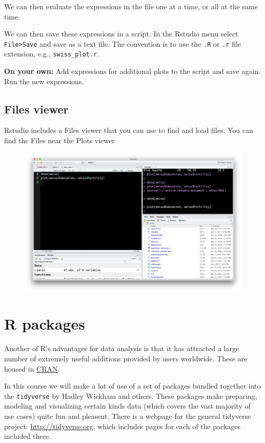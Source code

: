 \documentclass[12pt,]{book}
\theoremstyle{definition}
\theoremstyle{definition}
\theoremstyle{definition}
\theoremstyle{remark}
\begin{document}
We can then evaluate the expressions in the file one at a time, or all
at the same time.

We can then save these expressions in a script. In the Rstudio menu
select \texttt{File\textgreater{}Save} and save as a text file. The
convention is to use the \texttt{.R} or \texttt{.r} file extension,
e.g., \texttt{swiss\_plot.r}.

\textbf{On your own:} Add expressions for additional plots to the script
and save again. Run the new expressions.

\subsection{Files viewer}\label{files-viewer}

Rstudio includes a Files viewer that you can use to find and load files.
You can find the Files near the Plots viewer

\begin{figure}
\centering
\includegraphics{img/rstudio_files.png}
\caption{}
\end{figure}

\section{R packages}\label{r-packages}

Another of R's advantages for data analysis is that it has attracted a
large number of extremely useful additions provided by users worldwide.
These are housed in
\href{https://cran.r-project.org/web/packages/index.html}{CRAN}.

In this course we will make a lot of use of a set of packages bundled
together into the \texttt{tidyverse} by Hadley Wickham and others. These
packages make preparing, modeling and visualizing certain kinds data
(which covers the vast majority of use cases) quite fun and pleasent.
There is a webpage for the general tidyverse project:
\url{http://tidyverse.org}, which includes pages for each of the
packages included there.
\end{document}
